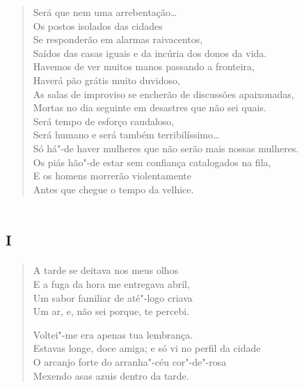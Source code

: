 \begin{verse}
Será que nem uma arrebentação\ldots{}\\
Os postos isolados das cidades\\
Se responderão em alarmas raivacentos,\\
Saídos das casas iguais e da incúria dos donos da vida.\\
Havemos de ver muitos manos passando a fronteira,\\
Haverá pão grátis muito duvidoso,\\
As salas de improviso se encherão de discussões apaixonadas,\\
Mortas no dia seguinte em desastres que não sei quais.\\
Será tempo de esforço caudaloso,\\
Será humano e será também terribilíssimo\ldots{}\\
Só há"-de haver mulheres que não serão mais nossas mulheres.\\
Os piás hão"-de estar sem confiança catalogados na fila,\\
E os homens morrerão violentamente\\
Antes que chegue o tempo da velhice.
\end{verse}


\chapter[«A tarde se deitava nos meus olhos»]{\textsc{i}}



\begin{verse}
A tarde se deitava nos meus olhos\\
E a fuga da hora me entregava abril,\\
Um sabor familiar de até"-logo criava\\
Um ar, e, não sei porque, te percebi.

Voltei"-me era apenas tua lembrança.\\
Estavas longe, doce amiga; e só vi no perfil da cidade\\
O arcanjo forte do arranha"-céu cor"-de"-rosa\\
Mexendo asas azuis dentro da tarde.
\end{verse}



